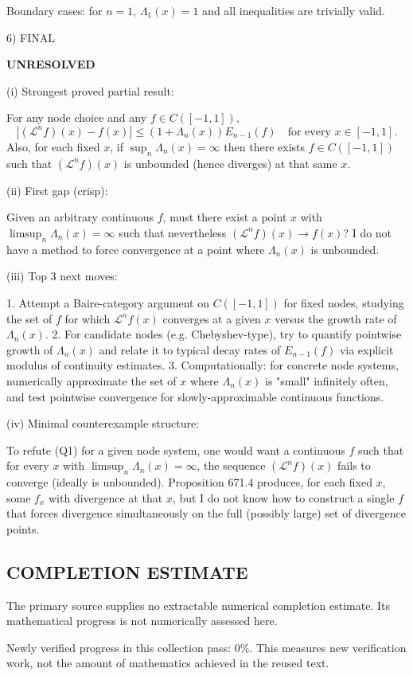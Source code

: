 Boundary cases: for $n=1$, $\Lambda_1(x)=1$ and all inequalities are trivially valid.

6) FINAL

\textbf{UNRESOLVED}

(i) Strongest proved partial result:

For any node choice and any $f\in C([-1,1])$,
\[
 |(\mathcal L^n f)(x)-f(x)|\le (1+\Lambda_n(x))E_{n-1}(f)\quad\text{for every }x\in[-1,1].
\]
Also, for each fixed $x$, if $\sup_n\Lambda_n(x)=\infty$ then there exists $f\in C([-1,1])$ such that $(\mathcal L^n f)(x)$ is unbounded (hence diverges) at that same $x$.

(ii) First gap (crisp):

Given an arbitrary continuous $f$, must there exist a point $x$ with $\limsup_n\Lambda_n(x)=\infty$ such that nevertheless $(\mathcal L^n f)(x)\to f(x)$? I do not have a method to force convergence at a point where $\Lambda_n(x)$ is unbounded.

(iii) Top 3 next moves:

1. Attempt a Baire-category argument on $C([-1,1])$ for fixed nodes, studying the set of $f$ for which $\mathcal L^n f(x)$ converges at a given $x$ versus the growth rate of $\Lambda_n(x)$.
2. For candidate nodes (e.g. Chebyshev-type), try to quantify pointwise growth of $\Lambda_n(x)$ and relate it to typical decay rates of $E_{n-1}(f)$ via explicit modulus of continuity estimates.
3. Computationally: for concrete node systems, numerically approximate the set of $x$ where $\Lambda_n(x)$ is "small" infinitely often, and test pointwise convergence for slowly-approximable continuous functions.

(iv) Minimal counterexample structure:

To refute (Q1) for a given node system, one would want a continuous $f$ such that for every $x$ with $\limsup_n\Lambda_n(x)=\infty$, the sequence $(\mathcal L^n f)(x)$ fails to converge (ideally is unbounded). Proposition 671.4 produces, for each fixed $x$, some $f_x$ with divergence at that $x$, but I do not know how to construct a single $f$ that forces divergence simultaneously on the full (possibly large) set of divergence points.




\subsection*{COMPLETION ESTIMATE}
The primary source supplies no extractable numerical completion estimate. Its mathematical progress is not numerically assessed here.

Newly verified progress in this collection pass: $0\%$. This measures new verification work, not the amount of mathematics achieved in the reused text.
